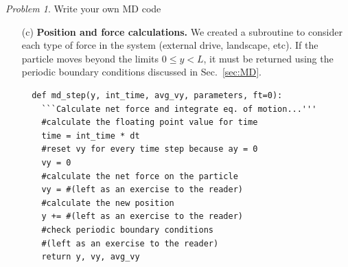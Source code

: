\documentclass[preprint,showpacs,preprintnumbers,amsmath,amssymb,aps,prb]{revtex4-1}
\theoremstyle{remark}
\newtheorem{problem}{Problem}
\begin{document}
\begin{problem}{Write your own MD code}
\begin{enumerate}
 \qquad Add a {\tt for} loop
     to step through each integer time step.
     This loop 
     controls
     the flow of the program
     and retains information for the particle position and other
     properties
     as a function of time.
     Assume this information
     will be calculated in a subroutine.
        
\qquad We used the subroutine {\bf single\_particle()}
     to calculate the  lengths of the arrays that contain the 
     position, velocity, and time data.
     The lengths of these arrays are  affected by
     how much data you choose to save
     (see comment following sample code).
     Define a loop to 
     calculate the particle position and velocity through each
       time step,
     calculated in the subroutine {\bf md\_step()}
     which will be described in more detail in (c).
\begin{verbatim}
def single_particle(parameters,plot="y-position"):
    ```Run MD simulation...'''    
    #define empty arrays to hold data as a function of time
    #(left as an exercise to the reader)   
    #loop through the integer time steps in the simulation
    for int_time in range(0,maxtime):
        #(left as an exercise to the reader)
        time += dt
\end{verbatim}

{\it Comment:}     
     A key decision for any MD algorithm
     is how much information to save during and after
     the simulation.
     We define the following constants
     to manage the length of arrays
     containing data.
     We found in practice that for 
     short simulations times
     we could save all data.
\begin{verbatim}
dict[`maxtime']=int(40/dict['freq'])   #total time steps 
dict[`writemovietime']=1   #write data to arrays for plotting
\end{verbatim}

\item[(c)] {\bf Position and force calculations.}
  We created a subroutine to consider each
  type of force in the system (external drive, landscape, etc).
  If the particle moves beyond the limits
  $0 \le y < L$,
  it must be returned 
  using the   periodic boundary conditions discussed
  in Sec.~\ref{sec:MD}.
\begin{verbatim}
  def md_step(y, int_time, avg_vy, parameters, ft=0):
    ```Calculate net force and integrate eq. of motion...'''
    #calculate the floating point value for time
    time = int_time * dt
    #reset vy for every time step because ay = 0 
    vy = 0 
    #calculate the net force on the particle
    vy = #(left as an exercise to the reader)
    #calculate the new position
    y += #(left as an exercise to the reader)
    #check periodic boundary conditions
    #(left as an exercise to the reader)
    return y, vy, avg_vy
\end{verbatim}


\end{enumerate}
\end{problem}
\end{document}
